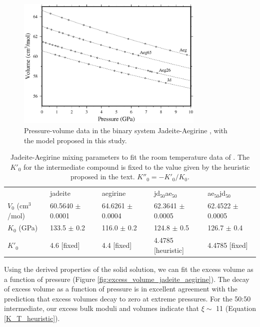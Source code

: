 \documentclass[review]{elsarticle}
\begin{document}
\begin{figure}[ht!]
  \centering
  \includegraphics[width=0.8\textwidth]{figures/jadeite_aegirine_P_V}
  \caption{Pressure-volume data in the binary system Jadeite-Aegirine \citep{NBLBT2006}, with the model proposed in this study.}
  \label{fig:PV_jadeite_aegirine}
\end{figure}

\begin{table}[ht!]
\centering
\caption{Jadeite-Aegirine mixing parameters to fit the room temperature data of \cite{NBLBT2006}. The $K'_0$ for the intermediate compound is fixed to the value given by the heuristic proposed in the text. $K''_0 = -K'_0/K_0$.}
\label{tab:jd_aeg}
\begin{tabular}{lllll}
                   & jadeite              & aegirine             & jd$_{50}$ae$_{50}$             & ae$_{50}$jd$_{50}$             \\
$V_0$ (cm$^3$/mol) & 60.5640 $\pm$ 0.0001 & 64.6261 $\pm$ 0.0004 & 62.3641 $\pm$ 0.0005 & 62.4522 $\pm$ 0.0005 \\
$K_0$ (GPa)        & 133.5 $\pm$ 0.2      & 116.0 $\pm$ 0.2      & 124.8 $\pm$ 0.5      & 126.7 $\pm$ 0.4      \\
$K'_0$             & 4.6 [fixed]                 & 4.4 [fixed]                 & 4.4785 [heuristic]              & 4.4785  [fixed]           
\end{tabular}
\end{table}

Using the derived properties of the solid solution, we can fit the excess volume as a function of pressure (Figure \ref{fig:excess_volume_jadeite_aegirine}). The decay of excess volume as a function of pressure is in excellent agreement with the prediction that excess volumes decay to zero at extreme pressures. For the 50:50 intermediate, our excess bulk moduli and volumes indicate that $\xi \sim$ 11 (Equation \ref{K_T_heuristic}).
\end{document}
